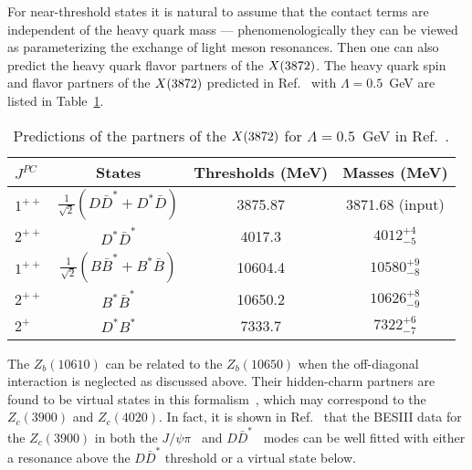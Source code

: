 For near-threshold states it is natural to assume that the contact terms are
independent of the heavy quark mass --- phenomenologically they can be viewed as
parameterizing the exchange of light meson resonances. Then one can also predict
the heavy quark flavor partners of the $X(3872)$. The heavy quark spin and flavor
partners of the $X(3872)$ predicted in Ref.~\cite{Guo:2013sya} with $\Lambda=0.5$~GeV
are listed in Table~\ref{tab:predictions}.
 
\begin{table}[tb]
\caption{\label{tab:predictions} Predictions of the partners of the $X(3872)$ for 
$\Lambda=0.5$~GeV in Ref.~\cite{Guo:2013sya}.
}
\begin{ruledtabular}
\begin{tabular}{l c c c }
        $J^{PC}$ & States & Thresholds (MeV) & Masses (MeV)
       \\\hline
       $1^{++}$ & $\frac1{\sqrt{2}}(D\bar D^*+D^*\bar D)$ &
       3875.87 & 3871.68 (input)  \\
                       $2^{++}$ & $D^*\bar D^*$ &
       4017.3  & $4012^{+4}_{-5}$  \\
       $1^{++}$ & $\frac1{\sqrt{2}}(B\bar B^*+B^*\bar B)$ &
       10604.4 & $10580^{+9}_{-8}$  \\
                       $2^{++}$ & $B^*\bar B^*$ &
       10650.2 & $10626^{+8}_{-9}$  \\
                       $2^{+}$ & $D^*B^*$ &
       7333.7 & $7322^{+6}_{-7}$  \\ 
   \end{tabular}
\end{ruledtabular}
\end{table}
The $Z_b(10610)$ can be related to the $Z_b(10650)$ when the off-diagonal 
interaction is neglected as discussed above.  Their hidden-charm partners
are found to be virtual states in this formalism~\cite{Guo:2013sya}, which may 
correspond to the $Z_c(3900)$ and $Z_c(4020)$. In fact, it is shown in 
Ref.~\cite{Albaladejo:2015lob} that the BES\-III data for the $Z_c(3900)$ in
both the $J/\psi\pi$~\cite{Ablikim:2013mio} and  $D\bar 
D^*$~\cite{Ablikim:2015swa} 
modes can be well fitted with either a resonance above the $D\bar D^*$
threshold or a virtual state below.


